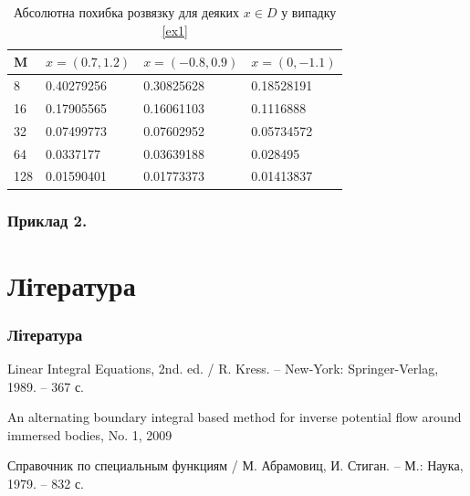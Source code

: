 \documentclass{beamer}
\numberwithin{equation}{section}
\begin{document}
	\begin{frame}
	
	\begin{table}
		\begin{tabular}{l l l l}
			\toprule
			\textbf{M} & $x = (0.7, 1.2)$ & $x = (-0.8, 0.9)$  & $x = (0, -1.1)$  \\
			\midrule
			8 & 0.40279256 & 0.30825628& 0.18528191 \\			
			16 & 0.17905565 & 0.16061103 & 0.1116888 \\
			32 & 0.07499773&  0.07602952 & 0.05734572 \\
			64 & 0.0337177 & 0.03639188 & 0.028495 \\
			128 & 0.01590401 & 0.01773373 & 0.01413837 \\
			\bottomrule
		\end{tabular}
		\caption{Абсолютна похибка розвязку для деяких $x \in D$ у випадку \ref{ex1} }
	\end{table}
\end{frame}
	
	\begin{frame}
		\frametitle{Приклад 2.}
	\end{frame}
	
	
	\section*{Література}
	\begin{frame}
		\thispagestyle{empty}
		\frametitle{Література}
		\begin{thebibliography}{99}
			
	
			Linear Integral Equations, 2nd. ed. / R. Kress. -- 
			New-York: Springer-Verlag, 1989. -- 367 с.
			
			An alternating boundary integral based method for inverse potential flow around immersed bodies, No. 1, 2009
	
			Справочник по специальным функциям / М. Абрамовиц, И. Стиган. 
			-- М.: Наука, 1979. -- 832 с.
	
		\end{thebibliography}
	\end{frame}

	

	
\end{document}
